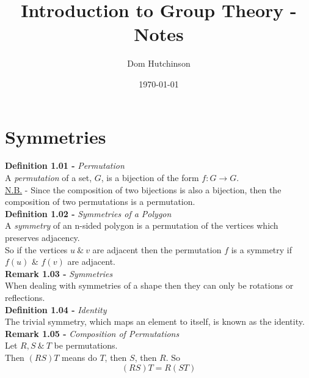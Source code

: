 \documentclass[11pt,a4paper]{article}
\begin{document}
\pagestyle{fancy}
\setlength\parindent{0pt}
\allowdisplaybreaks

\renewcommand{\headrulewidth}{0pt}
\newcommand{\vect}[1]{\boldsymbol{#1}}
\newcommand{\subtitle}[2]{\textbf{#1}\textit{#2}\\}
\newcommand{\dotprod}[0]{\boldsymbol{\cdot}}
\newcommand{\real}[0]{\mathbb{R}}
\newcommand{\nat}[0]{\mathbb{N}}
\newcommand{\field}[0]{\mathbb{F}}
\newcommand{\integers}[0]{\mathbb{Z}}
\newcommand{\vectorspace}[0]{\mathbb{V}}
\newcommand{\basis}[0]{\mathbb{B}}

\title{Introduction to Group Theory - Notes}
\author{Dom Hutchinson}
\date{\today}
\maketitle

\fancyhead[R]{\today}

\tableofcontents

\newpage

\section{Symmetries}

\subtitle{Definition 1.01 - }{Permutation}
A \textit{permutation} of a set, $G$, is a bijection of the form $f : G \to G$.\\
\underline{N.B.} - Since the composition of two bijections is also a bijection, then the composition of two permutations is a permutation.\\

\subtitle{Definition 1.02 - }{Symmetries of a Polygon}
A \textit{symmetry} of an n-sided polygon is a permutation of the vertices which preserves adjacency.\\
So if the vertices $u\ \&\ v$ are adjacent then the permutation $f$ is a symmetry if $f(u)$ \& $f(v)$ are adjacent.\\

\subtitle{Remark 1.03 - }{Symmetries}
When dealing with symmetries of a shape then they can only be rotations or reflections.\\

\subtitle{Definition 1.04 - }{Identity}
The trivial symmetry, which maps an element to itself, is known as the identity.\\

\subtitle{Remark 1.05 - }{Composition of Permutations}
Let $R, S\ \&\ T$ be permutations.\\
Then $(RS)T$ means do $T$, then $S$, then $R$. So $$(RS)T = R(ST)$$
\end{document}
